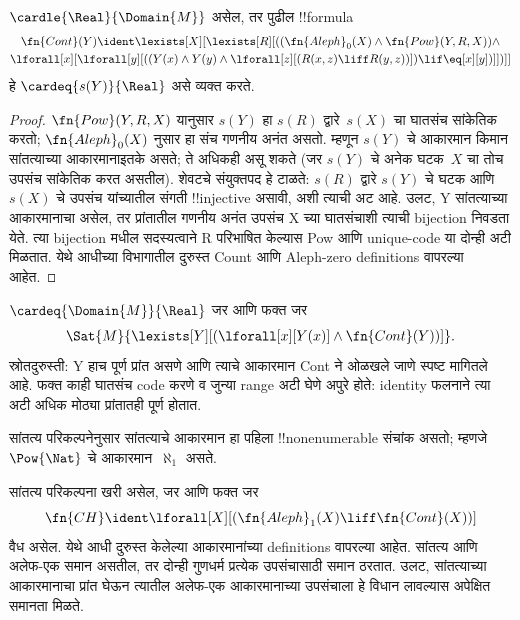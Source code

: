 \documentclass[../../../include/open-logic-section]{subfiles}
\begin{document}
\begin{prop}
$\cardle{\Real}{\Domain{M}}$ असेल, तर पुढील
!!{formula}
\begin{multline*}
\fn{Cont}(Y) \ident
\lexists[X][\lexists[R][((\fn{Aleph}_0(X) \land
      \fn{Pow}(Y, R, X)) \land \\
      \lforall[x][\lforall[y][((Y(x) \land {}
      Y(y) \land \lforall[z][(R(x,z) \liff R(y,z))]) \lif \eq[x][y])]])]]
\end{multline*}
हे $\cardeq{s(Y)}{\Real}$ असे व्यक्त करते.
\end{prop}

\begin{proof}
  $\fn{Pow}(Y, R, X)$ यानुसार $s(Y)$ हा $s(R)$
  द्वारे~$s(X)$ चा घातसंच सांकेतिक करतो;
  $\fn{Aleph}_0(X)$ नुसार हा संच गणनीय अनंत असतो.
  म्हणून $s(Y)$ चे आकारमान किमान सांतत्याच्या
  आकारमानाइतके असते; ते अधिकही असू शकते
  (जर $s(Y)$ चे अनेक घटक~$X$ चा तोच उपसंच
  सांकेतिक करत असतील). शेवटचे संयुक्तपद
  हे टाळते: $s(R)$ द्वारे $s(Y)$ चे घटक आणि
  $s(X)$ चे उपसंच यांच्यातील संगती
  !!{injective} असावी, अशी त्याची अट आहे.
  उलट, Y सांतत्याच्या आकारमानाचा असेल, तर प्रांतातील
  गणनीय अनंत उपसंच X च्या घातसंचाशी त्याची bijection निवडता
  येते. त्या bijection मधील सदस्यत्वाने R परिभाषित केल्यास
  Pow आणि unique-code या दोन्ही अटी मिळतात. येथे आधीच्या
  विभागातील दुरुस्त Count आणि Aleph-zero definitions वापरल्या आहेत.
\end{proof}

\begin{prop}
$\cardeq{\Domain{M}}{\Real}$ जर आणि फक्त जर
\begin{multline*}
  \Sat{M}{\lexists[Y][(\lforall[x][Y(x)] \land \fn{Cont}(Y))]}.
        \end{multline*}
  स्रोतदुरुस्ती: Y हाच पूर्ण प्रांत असणे आणि त्याचे
  आकारमान Cont ने ओळखले जाणे स्पष्ट मागितले आहे. फक्त
  काही घातसंच code करणे व जुन्या range अटी घेणे अपुरे होते:
  identity फलनाने त्या अटी अधिक मोठ्या प्रांतातही पूर्ण होतात.
  \end{prop}

\begin{explain}
सांतत्य परिकल्पनेनुसार सांतत्याचे आकारमान
हा पहिला !!{nonenumerable} संचांक असतो;
म्हणजे $\Pow{\Nat}$ चे आकारमान~$\aleph_1$ असते.
\end{explain}

\begin{prop}
सांतत्य परिकल्पना खरी असेल, जर आणि फक्त जर
\[\fn{CH} \ident
\lforall[X][(\fn{Aleph}_1(X) \liff \fn{Cont}(X))]\]
वैध असेल. येथे आधी दुरुस्त केलेल्या आकारमानांच्या
definitions वापरल्या आहेत. सांतत्य आणि अलेफ-एक समान असतील,
तर दोन्ही गुणधर्म प्रत्येक उपसंचासाठी समान ठरतात. उलट,
सांतत्याच्या आकारमानाचा प्रांत घेऊन त्यातील अलेफ-एक
आकारमानाच्या उपसंचाला हे विधान लावल्यास अपेक्षित समानता मिळते.
\end{prop}
\end{document}
